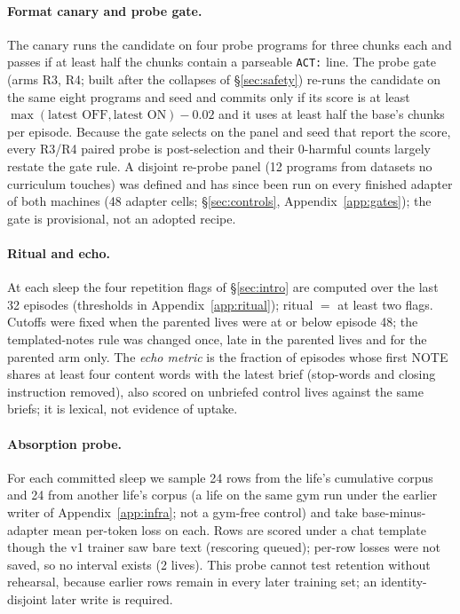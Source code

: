 \documentclass{article}
\begin{document}
\paragraph{Format canary and probe gate.} The canary runs the candidate on four probe programs for three chunks each and passes if at least half the chunks contain a parseable \texttt{ACT:} line. The probe gate (arms R3, R4; built after the collapses of \S\ref{sec:safety}) re-runs the candidate on the same eight programs and seed and commits only if its score is at least $\max(\text{latest OFF}, \text{latest ON}) - 0.02$ and it uses at least half the base's chunks per episode. Because the gate selects on the panel and seed that report the score, every R3/R4 paired probe is post-selection and their 0-harmful counts largely restate the gate rule. A disjoint re-probe panel (12 programs from datasets no curriculum touches) was defined and has since been run on every finished adapter of both machines (48 adapter cells; \S\ref{sec:controls}, Appendix~\ref{app:gates}); the gate is provisional, not an adopted recipe. %

\paragraph{Ritual and echo.} At each sleep the four repetition flags of \S\ref{sec:intro} are computed over the last 32 episodes (thresholds in Appendix~\ref{app:ritual}); ritual $=$ at least two flags. Cutoffs were fixed when the parented lives were at or below episode 48; the templated-notes rule was changed once, late in the parented lives and for the parented arm only. The \emph{echo metric} is the fraction of episodes whose first NOTE shares at least four content words with the latest brief (stop-words and closing instruction removed), also scored on unbriefed control lives against the same briefs; it is lexical, not evidence of uptake.

\paragraph{Absorption probe.} For each committed sleep we sample 24 rows from the life's cumulative corpus and 24 from another life's corpus (a life on the same gym run under the earlier writer of Appendix~\ref{app:infra}; not a gym-free control) and take base-minus-adapter mean per-token loss on each. Rows are scored under a chat template though the v1 trainer saw bare text (rescoring queued); per-row losses were not saved, so no interval exists (2 lives). This probe cannot test retention without rehearsal, because earlier rows remain in every later training set; an identity-disjoint later write is required.
\end{document}
